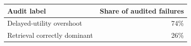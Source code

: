 \begin{tabular}{lr}
\toprule
Audit label & Share of audited failures \\
\midrule
Delayed-utility overshoot & 74\% \\
Retrieval correctly dominant & 26\% \\
\bottomrule
\end{tabular}

